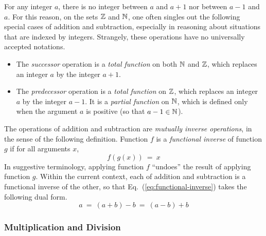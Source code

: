 \medskip

 
For any integer $a$, there is no integer between $a$ and $a+1$ nor between $a-1$ and $a$. For this reason, on the sets $\mathbb{Z}$ and $\mathbb{N}$, one often singles out the following special cases of addition and subtraction, especially in reasoning about situations that are indexed by integers.  Strangely, these operations have no universally accepted notations.
\begin{itemize}
\item
The {\it successor} operation is a {\em total function} on both $\mathbb{N}$ and $\mathbb{Z}$, which replaces an
integer $a$ by the integer $a+1$.
\medskip\item
The {\it predecessor} operation is a {\em total function} on $\mathbb{Z}$, which replaces an integer $a$ by the integer $a-1$.  It is a {\em partial function} on $\mathbb{N}$, which is defined only when the argument $a$ is positive (so that $a-1 \in \mathbb{N}$).
\end{itemize}

\smallskip

The operations of addition and subtraction are {\em mutually inverse operations}, in the sense of the following definition.  Function $f$ is a {\it functional inverse} of function $g$ if for all arguments $x$,
\begin{equation}
\label{eq:functional-inverse}
f(g(x)) \ = \ x
\end{equation}
In suggestive terminology, applying function $f$ ``undoes'' the result of applying function $g$.  Within the current context, each of addition and subtraction is a functional inverse of the other, so that Eq.~(\ref{eq:functional-inverse}) takes the following dual form.
\[ a \ = \ (a+b) -b \ = \ (a-b) +b \]

\subsubsection{Multiplication and Division}
 
 
 

